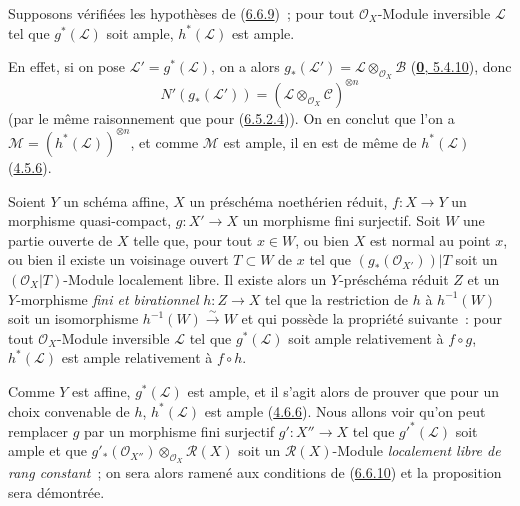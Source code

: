 \begin{corollary}[6.6.10]
\label{II.6.6.10-fr}
Supposons vérifiées les hypothèses de
\textup{(\hyperref[II.6.6.9-fr]{6.6.9})}~; pour tout $\mathcal{O}_X$-Module inversible
$\mathcal{L}$ tel que $g^*(\mathcal{L})$ soit ample, $h^*(\mathcal{L})$ est
ample.
\end{corollary}

En effet, si on pose $\mathcal{L}'=g^*(\mathcal{L})$, on a alors
$g_*(\mathcal{L}')=\mathcal{L}\otimes_{\mathcal{O}_X}\mathcal{B}$
(\hyperref[0.5.4.10-fr]{\textbf{0}, 5.4.10}), donc
\[
N'(g_*(\mathcal{L}'))=
(\mathcal{L}\otimes_{\mathcal{O}_X}\mathcal{C})^{\otimes n}
\]
(par le même raisonnement que pour
(\hyperref[II.6.5.2.4-fr]{6.5.2.4})). On en conclut que l'on a
$\mathcal{M}=(h^*(\mathcal{L}))^{\otimes n}$, et comme $\mathcal{M}$ est
ample, il en est de même de $h^*(\mathcal{L})$
(\hyperref[II.4.5.6-fr]{4.5.6}).

\begin{proposition}[6.6.11]
\label{II.6.6.11-fr}
Soient $Y$ un schéma affine, $X$ un préschéma noethérien réduit,
$f:X\to Y$ un morphisme quasi-compact, $g:X'\to X$ un morphisme fini
surjectif. Soit $W$ une partie ouverte de $X$ telle que, pour tout $x\in W$,
ou bien $X$ est normal au point $x$, ou bien il existe un voisinage ouvert
$T\subset W$ de $x$ tel que $(g_*(\mathcal{O}_{X'}))|T$ soit un
$(\mathcal{O}_X|T)$-Module localement libre. Il existe alors un
$Y$-préschéma réduit $Z$ et un $Y$-morphisme \emph{fini et birationnel}
$h:Z\to X$ tel que la restriction de $h$ à $h^{-1}(W)$ soit un isomorphisme
$h^{-1}(W)\xrightarrow{\sim}W$ et qui possède la propriété suivante~: pour
tout $\mathcal{O}_X$-Module inversible $\mathcal{L}$ tel que
$g^*(\mathcal{L})$ soit ample relativement à $f\circ g$, $h^*(\mathcal{L})$
est ample relativement à $f\circ h$.
\end{proposition}

Comme $Y$ est affine, $g^*(\mathcal{L})$ est ample, et il s'agit alors de
prouver que pour un choix convenable de $h$, $h^*(\mathcal{L})$ est ample
(\hyperref[II.4.6.6-fr]{4.6.6}). Nous allons voir qu'on peut remplacer $g$
par un morphisme fini surjectif $g':X''\to X$ tel que
${g'}^*(\mathcal{L})$ soit ample et que
$g'_*(\mathcal{O}_{X''})\otimes_{\mathcal{O}_X}\mathcal{R}(X)$ soit un
$\mathcal{R}(X)$-Module \emph{localement libre de rang constant}~; on sera
alors ramené aux conditions de (\hyperref[II.6.6.10-fr]{6.6.10}) et la
proposition sera démontrée.


